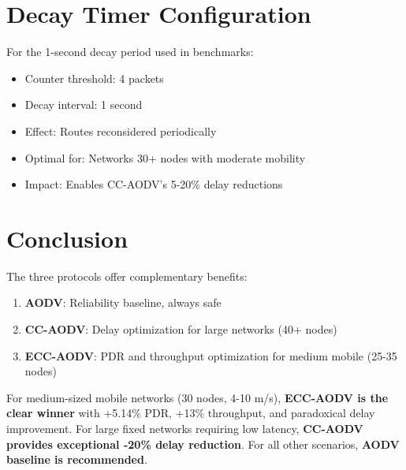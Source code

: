 \documentclass[12pt]{article}
\begin{document}
\section*{Decay Timer Configuration}

For the 1-second decay period used in benchmarks:
\begin{itemize}
    \item Counter threshold: 4 packets
    \item Decay interval: 1 second
    \item Effect: Routes reconsidered periodically
    \item Optimal for: Networks 30+ nodes with moderate mobility
    \item Impact: Enables CC-AODV's 5-20\% delay reductions
\end{itemize}

\section*{Conclusion}

The three protocols offer complementary benefits:
\begin{enumerate}
    \item \textbf{AODV}: Reliability baseline, always safe
    \item \textbf{CC-AODV}: Delay optimization for large networks (40+ nodes)
    \item \textbf{ECC-AODV}: PDR and throughput optimization for medium mobile (25-35 nodes)
\end{enumerate}

For medium-sized mobile networks (30 nodes, 4-10 m/s), \textbf{ECC-AODV is the clear winner} with +5.14\% PDR, +13\% throughput, and paradoxical delay improvement. For large fixed networks requiring low latency, \textbf{CC-AODV provides exceptional -20\% delay reduction}. For all other scenarios, \textbf{AODV baseline is recommended}.
\end{document}

